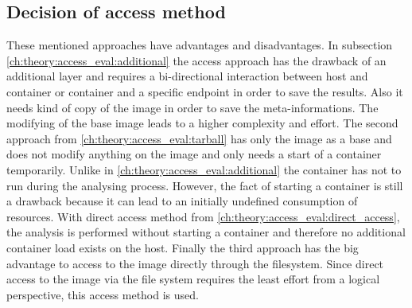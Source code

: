 \subsection{Decision of access method} 
\label{ch:theory:access_eval:decision_access}
These mentioned approaches have advantages and disadvantages. 	
In subsection \ref{ch:theory:access_eval:additional} the access approach has the drawback of an additional layer and requires a bi-directional interaction between host and container or container and a specific endpoint in order to save the results. Also it needs kind of copy of the image in order to save the meta-informations. The modifying of the base image leads to a higher complexity and effort. 
The second approach from \ref{ch:theory:access_eval:tarball} has only the image as a base and does not modify anything on the image and only needs a start of a container temporarily. Unlike in \ref{ch:theory:access_eval:additional} the container has not to run during the analysing process. However, the fact of starting a container is still a drawback because it can lead to an initially undefined consumption of resources.
With direct access method from \ref{ch:theory:access_eval:direct_access}, the analysis is performed without starting a container and therefore no additional container load exists on the host.
Finally the third approach has the big advantage to access to the image directly through the filesystem. 
Since direct access to the image via the file system requires the least effort from a logical perspective, this access method is used.